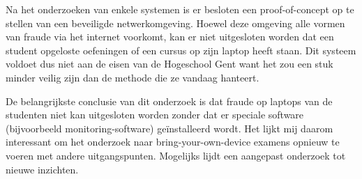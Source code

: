 Na het onderzoeken van enkele systemen is er besloten een proof-of-concept op te stellen van een beveiligde netwerkomgeving. Hoewel deze omgeving alle vormen van fraude via het internet voorkomt, kan er niet uitgesloten worden dat een student opgeloste oefeningen of een cursus op zijn laptop heeft staan. Dit systeem voldoet dus niet aan de eisen van de Hogeschool Gent want het zou een stuk minder veilig zijn dan de methode die ze vandaag hanteert. 

De belangrijkste conclusie van dit onderzoek is dat fraude op laptops van de studenten niet kan uitgesloten worden zonder dat er speciale software (bijvoorbeeld monitoring-software) ge\"{i}nstalleerd wordt. Het lijkt mij daarom interessant om het onderzoek naar bring-your-own-device examens opnieuw te voeren met andere uitgangspunten. Mogelijks lijdt een aangepast onderzoek tot nieuwe inzichten.
